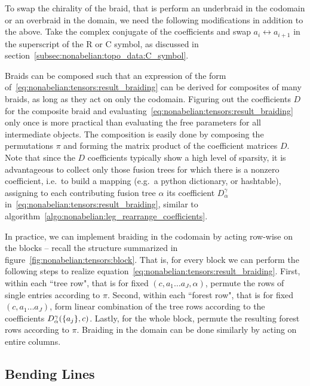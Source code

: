 To swap the chirality of the braid, that is perform an underbraid in the codomain or an overbraid in the domain, we need the following modifications in addition to the above.
%
Take the complex conjugate of the coefficients and swap $a_i \leftrightarrow a_{i+1}$ in the superscript of the R or C symbol, as discussed in section~\ref{subsec:nonabelian:topo_data:C_symbol}.

Braids can be composed such that an expression of the form of~\eqref{eq:nonabelian:tensors:result_braiding} can be derived for composites of many braids, as long as they act on only the codomain.
%
Figuring out the coefficients $D$ for the composite braid and evaluating~\eqref{eq:nonabelian:tensors:result_braiding} only once is more practical than evaluating the free parameters for all intermediate objects.
%
The composition is easily done by composing the permutations $\pi$ and forming the matrix product of the coefficient matrices $D$.
%
Note that since the $D$ coefficients typically show a high level of sparsity, it is advantageous to collect only those fusion trees for which there is a nonzero coefficient, i.e.~to build a mapping (e.g.~a python dictionary, or hashtable), assigning to each contributing fusion tree $\alpha$ its coefficient $D^\gamma_\alpha$ in~\eqref{eq:nonabelian:tensors:result_braiding}, similar to algorithm~\ref{algo:nonabelian:leg_rearrange_coefficients}.

In practice, we can implement braiding in the codomain by acting row-wise on the blocks -- recall the structure summarized in figure~\ref{fig:nonabelian:tensors:block}.
%
That is, for every block we can perform the following steps to realize equation~\eqref{eq:nonabelian:tensors:result_braiding}.
%
First, within each ``tree row", that is for fixed $(c,a_1\dots a_J,\alpha)$, permute the rows of single entries according to $\pi$.
%
Second, within each ``forest row", that is for fixed $(c,a_1\dots a_J)$, form linear combination of the tree rows according to the coefficients $D^\gamma_\alpha(\set{a_j},c)$.
%
Lastly, for the whole block, permute the resulting forest rows according to $\pi$.
%
Braiding in the domain can be done similarly by acting on entire columns.

\subsection{Bending Lines}
\label{subsec:nonabelian:tensors:bending}

